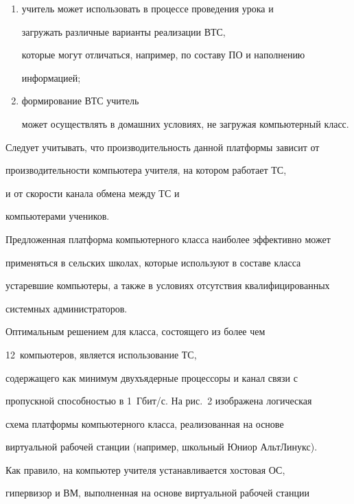 \begin{enumerate}[(1)]


\item учитель может использовать в процессе проведения урока и 


загружать различные варианты реализации ВТС, 


которые могут отличаться, например, по составу ПО и наполнению 


информацией;


\item  формирование ВТС учитель 


может осуществлять в домашних условиях, не загружая компьютерный класс.


\end{enumerate}





Следует учитывать, что производительность данной платформы зависит от 


производительности компьютера учителя, на котором работает ТС, 


и от скорости канала обмена между ТС и 


компьютерами учеников.  





Предложенная платформа компьютерного класса наиболее эффективно может 


применяться в сельских школах, которые используют в составе класса 


устаревшие компьютеры, а также в условиях отсутствия квалифицированных 


системных администраторов. 





Оптимальным решением для класса, состоящего из более чем 


12~компьютеров, является использование ТС, 


содержащего как минимум двухъядерные процессоры и канал связи с 


пропускной способностью в 1~Гбит/с. На рис.~2 изображена логическая 


схема платформы компьютерного класса, реализованная на основе 


виртуальной рабочей станции (например, школьный Юниор АльтЛинукс). 


Как правило, на компьютер учителя устанавливается хостовая ОС, 


гипервизор и ВМ, выполненная на основе виртуальной рабочей станции 


